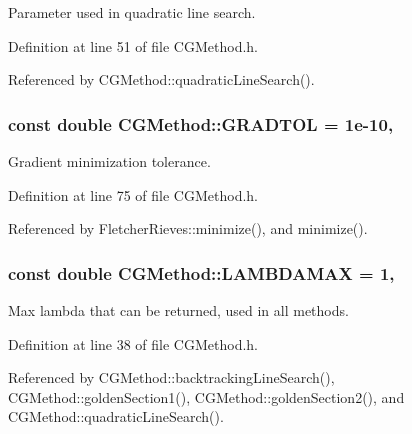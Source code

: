 Parameter used in quadratic line search. 



Definition at line 51 of file C\+G\+Method.\+h.



Referenced by C\+G\+Method\+::quadratic\+Line\+Search().

\hypertarget{classCGMethod_ad0118dc4da7526f196a4b4172bba9625}{
\subsubsection[{G\+R\+A\+D\+T\+O\+L}]{\setlength{\rightskip}{0pt plus 5cm}const double C\+G\+Method\+::\+G\+R\+A\+D\+T\+O\+L = 1e-\/10\hspace{0.3cm}{\ttfamily [protected]}, {\ttfamily [inherited]}}}\label{classCGMethod_ad0118dc4da7526f196a4b4172bba9625}


Gradient minimization tolerance. 



Definition at line 75 of file C\+G\+Method.\+h.



Referenced by Fletcher\+Rieves\+::minimize(), and minimize().

\hypertarget{classCGMethod_a04127fd877e82fdf4f71cd3709581419}{
\subsubsection[{L\+A\+M\+B\+D\+A\+M\+A\+X}]{\setlength{\rightskip}{0pt plus 5cm}const double C\+G\+Method\+::\+L\+A\+M\+B\+D\+A\+M\+A\+X = 1\hspace{0.3cm}{\ttfamily [protected]}, {\ttfamily [inherited]}}}\label{classCGMethod_a04127fd877e82fdf4f71cd3709581419}


Max lambda that can be returned, used in all methods. 



Definition at line 38 of file C\+G\+Method.\+h.



Referenced by C\+G\+Method\+::backtracking\+Line\+Search(), C\+G\+Method\+::golden\+Section1(), C\+G\+Method\+::golden\+Section2(), and C\+G\+Method\+::quadratic\+Line\+Search().

